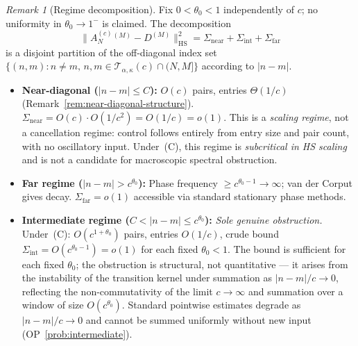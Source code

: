 \documentclass[12pt,a4paper]{amsart}
\theoremstyle{definition}
\theoremstyle{remark}
\newtheorem{remark}[theorem]{Remark}
\newcommand{\Ac}{A_N^{(c)}}
\begin{document}
\begin{remark}[Regime decomposition]
\label{rem:regime-decomposition}
Fix $0<\theta_0<1$ independently
of $c$; no uniformity in
$\theta_0\to 1^-$ is claimed.
The decomposition
\begin{equation}\label{eq:HS-regimes}
  \|\Ac^{(M)}-D^{(M)}\|_{\mathrm{HS}}^2
  = \Sigma_{\mathrm{near}}
  + \Sigma_{\mathrm{int}}
  + \Sigma_{\mathrm{far}}
\end{equation}
is a disjoint partition of the
off-diagonal index set
$\{(n,m): n\ne m,\,
n,m\in\mathcal{T}_{\alpha,\kappa}(c)
\cap(N,M]\}$
according to $|n-m|$.

\begin{itemize}[leftmargin=*]
\item \textbf{Near-diagonal
  ($|n-m|\le C$):}
  $O(c)$ pairs, entries $\Theta(1/c)$
  (Remark~\ref{rem:near-diagonal-structure}).
  $\Sigma_{\mathrm{near}}
  =O(c)\cdot O(1/c^2)=O(1/c)=o(1)$.
  This is a \emph{scaling regime},
  not a cancellation regime:
  control follows entirely from entry
  size and pair count, with no
  oscillatory input.
  Under~(C), this regime is
  \emph{subcritical in HS scaling}
  and is not a candidate for
  macroscopic spectral obstruction.

\item \textbf{Far regime
  ($|n-m|>c^{\theta_0}$):}
  Phase frequency
  $\ge c^{\theta_0-1}\to\infty$;
  van der Corput gives decay.
  $\Sigma_{\mathrm{far}}=o(1)$
  accessible via standard stationary
  phase methods.

\item \textbf{Intermediate regime
  ($C<|n-m|\le c^{\theta_0}$):}
  \emph{Sole genuine obstruction.}
  Under~(C): $O(c^{1+\theta_0})$
  pairs, entries $O(1/c)$,
  crude bound
  $\Sigma_{\mathrm{int}}
  =O(c^{\theta_0-1})=o(1)$
  for each fixed $\theta_0<1$.
  The bound is sufficient for each
  fixed $\theta_0$;
  the obstruction is structural, not
  quantitative --- it arises from the
  instability of the transition kernel
  under summation as $|n-m|/c\to 0$,
  reflecting the non-commutativity of
  the limit $c\to\infty$ and summation
  over a window of size
  $O(c^{\theta_0})$.
  Standard pointwise estimates degrade
  as $|n-m|/c\to 0$ and cannot be
  summed uniformly without new input
  (OP~\ref{prob:intermediate}).
\end{itemize}
\end{remark}
\end{document}
